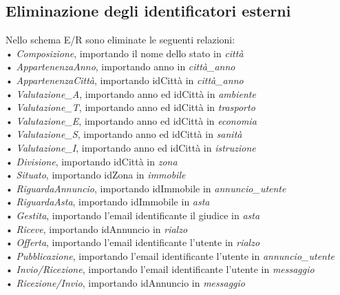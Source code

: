 \documentclass[a4paper,12pt]{report}
\begin{document}
            \subsection*{Eliminazione degli identificatori esterni}
            Nello schema E/R sono eliminate le seguenti relazioni: \\
            • \textit{Composizione}, importando il nome dello stato in \textit{città} \\
            • \textit{AppartenenzaAnno}, importando anno in \textit{città\_anno} \\
            • \textit{AppartenenzaCittà}, importando idCittà in \textit{città\_anno} \\
            • \textit{Valutazione\_A}, importando anno ed idCittà in \textit{ambiente} \\
            • \textit{Valutazione\_T}, importando anno ed idCittà in \textit{trasporto} \\
            • \textit{Valutazione\_E}, importando anno ed idCittà in \textit{economia} \\
            • \textit{Valutazione\_S}, importando anno ed idCittà in \textit{sanità} \\
            • \textit{Valutazione\_I}, importando anno ed idCittà in \textit{istruzione} \\
            • \textit{Divisione}, importando idCittà in \textit{zona} \\
            • \textit{Situato}, importando idZona in \textit{immobile} \\
            • \textit{RiguardaAnnuncio}, importando idImmobile in \textit{annuncio\_utente} \\
            • \textit{RiguardaAsta}, importando idImmobile in \textit{asta} \\
            • \textit{Gestita}, importando l'email identificante il giudice in \textit{asta} \\
            • \textit{Riceve}, importando idAnnuncio in \textit{rialzo} \\
            • \textit{Offerta}, importando l'email identificante l'utente in \textit{rialzo} \\
            • \textit{Pubblicazione}, importando l'email identificante l'utente in \textit{annuncio\_utente} \\
            • \textit{Invio/Ricezione}, importando l'email identificante l'utente in \textit{messaggio} \\
            • \textit{Ricezione/Invio}, importando idAnnuncio in \textit{messaggio} \\
\end{document}
